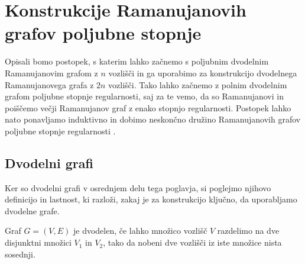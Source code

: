 \section{Konstrukcije Ramanujanovih grafov poljubne stopnje}
Opisali bomo postopek, s katerim lahko začnemo s poljubnim dvodelnim Ramanujanovim grafom z \(n\) vozlišči in ga uporabimo za konstrukcijo dvodelnega Ramanujanovega grafa z \(2n\) vozlišči. Tako lahko začnemo z polnim dvodelnim grafom poljubne stopnje regularnosti, saj za te vemo, da so Ramanujanovi in poiščemo večji Ramanujanov graf z enako stopnjo regularnosti. Postopek lahko nato ponavljamo induktivno in dobimo neskončno družino Ramanujanovih grafov poljubne stopnje regularnosti \cite{marcus2014interlacingfamiliesibipartite}.

\subsection{Dvodelni grafi}
Ker so dvodelni grafi v osrednjem delu tega poglavja, si poglejmo njihovo definicijo in lastnost, ki razloži, zakaj je za konstrukcijo ključno, da uporabljamo dvodelne grafe.
\begin{definicija}
    Graf \(G = (V, E)\) je dvodelen, če lahko množico vozlišč \(V\) razdelimo na dve disjunktni množici \(V_1\) in \(V_2\), tako da nobeni dve vozlišči iz iste množice nista sosednji.
\end{definicija}

